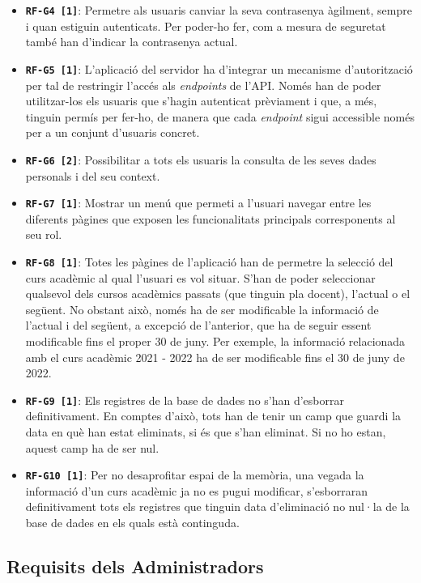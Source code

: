 \documentclass[a4paper,12pt]{ThesisStyle}
\begin{document}
\begin{itemize}
  \item \texttt{\textbf{RF-G4 [1]}}: Permetre als usuaris canviar la seva contrasenya àgilment, sempre i quan estiguin autenticats. Per poder-ho fer, com a mesura de seguretat també han d'indicar la contrasenya actual.
  \item \texttt{\textbf{RF-G5 [1]}}: L'aplicació del servidor ha d'integrar un mecanisme d'autorització per tal de restringir l'accés als \textit{endpoints} de l'API. Només han de poder utilitzar-los els usuaris que s'hagin autenticat prèviament i que, a més, tinguin permís per fer-ho, de manera que cada \textit{endpoint} sigui accessible només per a un conjunt d'usuaris concret.
  \item \texttt{\textbf{RF-G6 [2]}}: Possibilitar a tots els usuaris la consulta de les seves dades personals i del seu context.
  \item \texttt{\textbf{RF-G7 [1]}}: Mostrar un menú que permeti a l'usuari navegar entre les diferents pàgines que exposen les funcionalitats principals corresponents al seu rol.
  \item \texttt{\textbf{RF-G8 [1]}}: Totes les pàgines de l'aplicació han de permetre la selecció del curs acadèmic al qual l'usuari es vol situar. S'han de poder seleccionar qualsevol dels cursos acadèmics passats (que tinguin pla docent), l'actual o el següent. No obstant això, només ha de ser modificable la informació de l'actual i del següent, a excepció de l'anterior, que ha de seguir essent modificable fins el proper 30 de juny. Per exemple, la informació relacionada amb el curs acadèmic 2021 - 2022 ha de ser modificable fins el 30 de juny de 2022.
  \item \texttt{\textbf{RF-G9 [1]}}: Els registres de la base de dades no s'han d'esborrar definitivament. En comptes d'això, tots han de tenir un camp que guardi la data en què han estat eliminats, si és que s'han eliminat. Si no ho estan, aquest camp ha de ser nul.
  \item \texttt{\textbf{RF-G10 [1]}}: Per no desaprofitar espai de la memòria, una vegada la informació d'un curs acadèmic ja no es pugui modificar, s'esborraran definitivament tots els registres que tinguin data d'eliminació no nul·la de la base de dades en els quals està continguda.
\end{itemize}


\subsection{Requisits dels Administradors}
\label{subsec:requisits_administradors}
\end{document}
